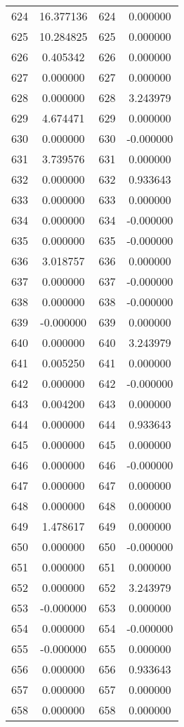 \documentclass[12pt]{article}
\begin{document}
\begin{longtable}{@{}cccc@{}}
624 & 16.377136 & 624 & 0.000000 \\
625 & 10.284825 & 625 & 0.000000 \\
626 & 0.405342 & 626 & 0.000000 \\
627 & 0.000000 & 627 & 0.000000 \\
628 & 0.000000 & 628 & 3.243979 \\
629 & 4.674471 & 629 & 0.000000 \\
630 & 0.000000 & 630 & -0.000000 \\
631 & 3.739576 & 631 & 0.000000 \\
632 & 0.000000 & 632 & 0.933643 \\
633 & 0.000000 & 633 & 0.000000 \\
634 & 0.000000 & 634 & -0.000000 \\
635 & 0.000000 & 635 & -0.000000 \\
636 & 3.018757 & 636 & 0.000000 \\
637 & 0.000000 & 637 & -0.000000 \\
638 & 0.000000 & 638 & -0.000000 \\
639 & -0.000000 & 639 & 0.000000 \\
640 & 0.000000 & 640 & 3.243979 \\
641 & 0.005250 & 641 & 0.000000 \\
642 & 0.000000 & 642 & -0.000000 \\
643 & 0.004200 & 643 & 0.000000 \\
644 & 0.000000 & 644 & 0.933643 \\
645 & 0.000000 & 645 & 0.000000 \\
646 & 0.000000 & 646 & -0.000000 \\
647 & 0.000000 & 647 & 0.000000 \\
648 & 0.000000 & 648 & 0.000000 \\
649 & 1.478617 & 649 & 0.000000 \\
650 & 0.000000 & 650 & -0.000000 \\
651 & 0.000000 & 651 & 0.000000 \\
652 & 0.000000 & 652 & 3.243979 \\
653 & -0.000000 & 653 & 0.000000 \\
654 & 0.000000 & 654 & -0.000000 \\
655 & -0.000000 & 655 & 0.000000 \\
656 & 0.000000 & 656 & 0.933643 \\
657 & 0.000000 & 657 & 0.000000 \\
658 & 0.000000 & 658 & 0.000000 \\

\end{longtable}
\end{document}
